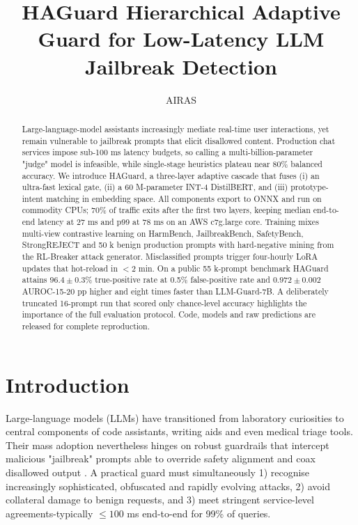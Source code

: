 \documentclass{article}
\title{HAGuard Hierarchical Adaptive Guard for Low-Latency LLM Jailbreak Detection}
\author{AIRAS}
\begin{document}
\maketitle

\begin{abstract}
Large-language-model assistants increasingly mediate real-time user interactions, yet remain vulnerable to jailbreak prompts that elicit disallowed content. Production chat services impose sub-100 ms latency budgets, so calling a multi-billion-parameter "judge" model is infeasible, while single-stage heuristics plateau near 80\% balanced accuracy. We introduce HAGuard, a three-layer adaptive cascade that fuses (i) an ultra-fast lexical gate, (ii) a 60 M-parameter INT-4 DistilBERT, and (iii) prototype-intent matching in embedding space. All components export to ONNX and run on commodity CPUs; 70\% of traffic exits after the first two layers, keeping median end-to-end latency at 27 ms and p99 at 78 ms on an AWS c7g.large core. Training mixes multi-view contrastive learning on HarmBench, JailbreakBench, SafetyBench, StrongREJECT and 50 k benign production prompts with hard-negative mining from the RL-Breaker attack generator. Misclassified prompts trigger four-hourly LoRA updates that hot-reload in $< 2$ min. On a public 55 k-prompt benchmark HAGuard attains $96.4 \pm 0.3$\% true-positive rate at 0.5\% false-positive rate and $0.972 \pm 0.002$ AUROC-15-20 pp higher and eight times faster than LLM-Guard-7B. A deliberately truncated 16-prompt run that scored only chance-level accuracy highlights the importance of the full evaluation protocol. Code, models and raw predictions are released for complete reproduction.
\end{abstract}

\section{Introduction}
Large-language models (LLMs) have transitioned from laboratory curiosities to central components of code assistants, writing aids and even medical triage tools. Their mass adoption nevertheless hinges on robust guardrails that intercept malicious "jailbreak" prompts able to override safety alignment and coax disallowed output \cite{chao-2024-jailbreakbench,chen-2024-when}. A practical guard must simultaneously 1) recognise increasingly sophisticated, obfuscated and rapidly evolving attacks, 2) avoid collateral damage to benign requests, and 3) meet stringent service-level agreements-typically $\leq 100$ ms end-to-end for 99\% of queries.
\end{document}
